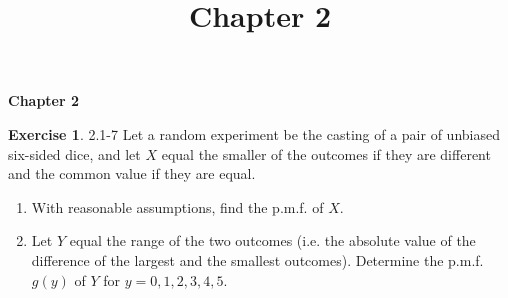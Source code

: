 \documentclass[14pt]{article}
\theoremstyle{definition}
\newtheorem*{exercise}{Exercise}
\theoremstyle{remark}
\numberwithin{equation}{section}
\numberwithin{theorem}{section}
\begin{document}
\setcounter{section}{0}
\title{Chapter 2}

\thispagestyle{empty}
\begin{center}
{\LARGE \bf Chapter 2}
\end{center}

\begin{exercise}{2.1-7}
    Let a random experiment be the casting of a pair of unbiased six-sided dice, 
    and let $X$ equal the smaller of the outcomes if they are different and the common 
    value if they are equal.
    \begin{enumerate}
    \item With reasonable assumptions, find the p.m.f. of $X$.
    \item Let $Y$ equal the range of the two outcomes (i.e. the absolute value of the difference
     of the largest and the smallest outcomes). Determine the p.m.f. $g(y)$ of $Y$ for $y=0, 1, 2, 3, 4, 5$.
    \end{enumerate}
\end{exercise}
\end{document}
